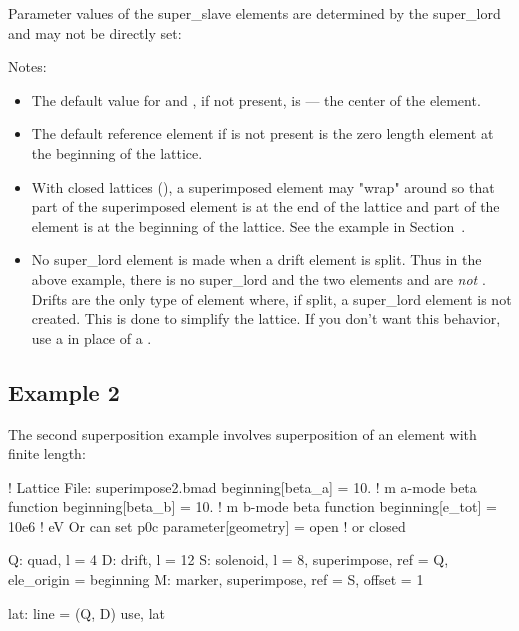 \documentclass{hitec}     %
\begin{document}
Parameter values of the super_slave elements are determined by the super_lord and may not be directly set:

Notes:
\vspace{-5 pt}
\begin{itemize}
\item
The default value for  and , if not present, is  --- the center of
the element.
\item
The default reference element if  is not present is the zero length  element
at the beginning of the lattice.
\item
With closed lattices (), a superimposed element may "wrap" around so that part of
the superimposed element is at the end of the lattice and part of the element is at the beginning of
the lattice. See the example in Section~.
\item
No super_lord element is made when a drift element is split. Thus in the above example, there is no
 super_lord and the two elements  and  are {\em not} .
Drifts are the only type of element where, if split, a super_lord element is not created. This is done
to simplify the lattice. If you don't want this behavior, use a  in place of a .
\end{itemize}

\newpage

\subsection{Example 2}

The second superposition example involves superposition of an element with finite length:
\begin{code}
! Lattice File: superimpose2.bmad
beginning[beta_a] = 10.   ! m  a-mode beta function
beginning[beta_b] = 10.   ! m  b-mode beta function
beginning[e_tot] = 10e6   ! eV   Or can set p0c
parameter[geometry] = open      ! or closed

Q: quad, l = 4
D: drift, l = 12
S: solenoid, l = 8, superimpose, ref = Q, ele_origin = beginning
M: marker, superimpose, ref = S, offset = 1

lat: line = (Q, D)
use, lat
\end{code}
\end{document}
